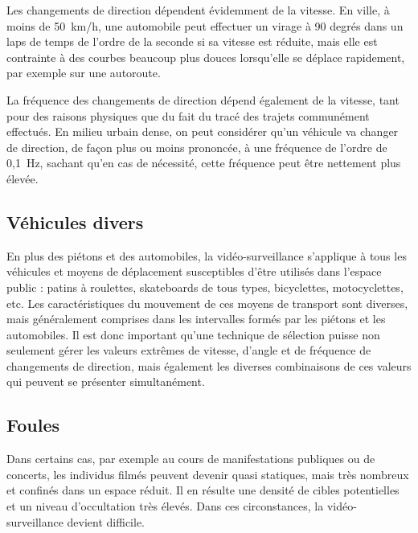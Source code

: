 	
	Les changements de direction dépendent évidemment de la vitesse. En ville, à moins de 50~km/h, une automobile peut effectuer un virage à 90 degrés dans un laps de temps de l'ordre de la seconde si sa vitesse est réduite, mais elle est contrainte à des courbes beaucoup plus douces lorsqu'elle se déplace rapidement, par exemple sur une autoroute.
	
	La fréquence des changements de direction dépend également de la vitesse, tant pour des raisons physiques que du fait du tracé des trajets communément effectués. En milieu urbain dense, on peut considérer qu'un véhicule va changer de direction, de façon plus ou moins prononcée, à une fréquence de l'ordre de 0,1~Hz, sachant qu'en cas de nécessité, cette fréquence peut être nettement plus élevée.
	
	\subsection{Véhicules divers}
	En plus des piétons et des automobiles, la vidéo-surveillance s'applique à tous les véhicules et moyens de déplacement susceptibles d'être utilisés dans l'espace public : patins à roulettes, skateboards de tous types, bicyclettes, motocyclettes, etc. Les caractéristiques du mouvement de ces moyens de transport sont diverses, mais généralement comprises dans les intervalles formés par les piétons et les automobiles. Il est donc important qu'une technique de sélection puisse non seulement gérer les valeurs extrêmes de vitesse, d'angle et de fréquence de changements de direction, mais également les diverses combinaisons de ces valeurs qui peuvent se présenter simultanément.
	
	\subsection{Foules}
	Dans certains cas, par exemple au cours de manifestations publiques ou de concerts, les individus filmés peuvent devenir quasi statiques, mais très nombreux et confinés dans un espace réduit. Il en résulte une densité de cibles potentielles et un niveau d'occultation très élevés. Dans ces circonstances, la vidéo-surveillance devient difficile.
	
